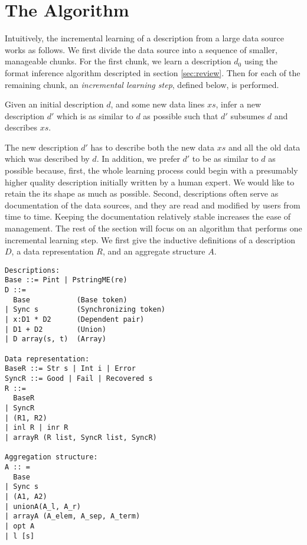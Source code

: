 \section{The Algorithm}
\label{sec:algo}
Intuitively, the incremental learning of a description from a large data source works
as follows. We first divide the data source into a sequence of smaller, manageable chunks.
For the first chunk, we learn a description $d_0$ using the format inference
algorithm descripted in section \ref{sec:review}. Then for each of the remaining chunk,
an {\em incremental learning step}, defined below, is performed.  

\begin{definition}
Given an initial description $d$, and some new data lines $xs$, infer a new description $d'$ 
which is as similar to $d$ as possible such that $d'$ subsumes $d$ and describes $xs$.
\end{definition}

The new description $d'$ has to describe both the new data $xs$ and
all the old data which was described by $d$. 
In addition, we prefer $d'$ to be as similar to $d$ as possible because, 
first, the whole learning process could begin with a presumably higher quality description 
initially written by a human expert. We would like to retain the its shape as much as possible.
Second, descriptions often serve as documentation of the data sources, and they are
read and modified by users from time to time. Keeping the documentation relatively stable increases
the ease of management. The rest of the section will focus on an algorithm that
performs one incremental learning step.
We first give the inductive definitions of
a description $D$, a data representation $R$, and an aggregate structure $A$. 

{\small 
\begin{verbatim}
Descriptions:
Base ::= Pint | PstringME(re)
D ::=   
  Base           (Base token)
| Sync s         (Synchronizing token) 
| x:D1 * D2      (Dependent pair)
| D1 + D2        (Union)
| D array(s, t)  (Array)

Data representation:
BaseR ::= Str s | Int i | Error
SyncR ::= Good | Fail | Recovered s 
R ::=
  BaseR
| SyncR
| (R1, R2)
| inl R | inr R
| arrayR (R list, SyncR list, SyncR)

Aggregation structure:
A :: = 
  Base
| Sync s
| (A1, A2)
| unionA(A_l, A_r)
| arrayA (A_elem, A_sep, A_term)
| opt A
| l [s]
\end{verbatim}
}

